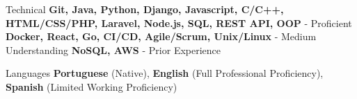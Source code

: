 
\begin{cvskills}
  \cvskill
    {Technical} %
    {\textbf{Git, Java, Python, Django, Javascript, C/C++, HTML/CSS/PHP, Laravel, Node.js, SQL, REST API, OOP} - Proficient \break \textbf{Docker, React, Go, CI/CD, Agile/Scrum, Unix/Linux} - Medium Understanding \break \textbf{NoSQL, AWS} - Prior Experience} %

  \cvskill
    {Languages} %
    {\textbf{Portuguese} (Native), \textbf{English} (Full Professional Proficiency), \textbf{Spanish} (Limited Working Proficiency)} %

\end{cvskills}